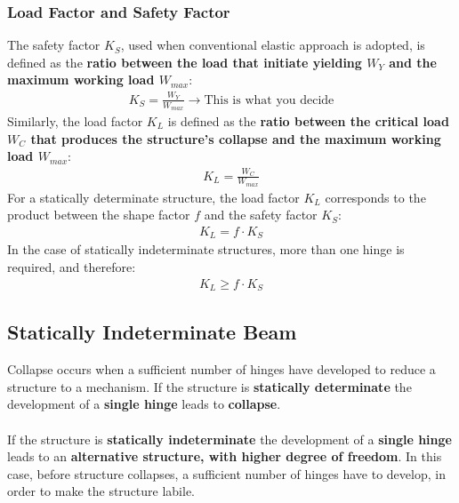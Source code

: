 \subsubsection{\large Load Factor and Safety Factor}
The safety factor $K_S$, used when conventional elastic approach is adopted, is defined as the \textbf{ratio between the load that initiate yielding $W_Y$ and the maximum working load $W_{max}$}:
\begin{gather}
  K_S = \frac{W_Y}{W_{max}} \longrightarrow \text{This is what you decide}
\end{gather}
Similarly, the load factor $K_L$ is defined as the \textbf{ratio between the critical load $W_C$ that produces the structure’s collapse and the maximum working load $W_{max}$}:
\begin{gather}
  K_L = \frac{W_C}{W_{max}}
\end{gather}
For a statically determinate structure, the load factor $K_L$ corresponds to the product between the shape factor $f$ and the safety factor $K_S$:
\begin{gather}
  K_L = f\cdot K_S
\end{gather}
In the case of statically indeterminate structures, more than one hinge is required, and therefore:
\begin{gather}
  K_L \geq f\cdot K_S
\end{gather}
\subsection{Statically Indeterminate Beam}
Collapse occurs when a sufficient number of hinges have developed to reduce a structure to a mechanism. If the structure is \textbf{statically determinate} the development of a \textbf{single hinge} leads to \textbf{collapse}. \\\\
If the structure is \textbf{statically indeterminate} the development of a \textbf{single hinge} leads to an \textbf{alternative structure, with higher degree of freedom}. In this case, before structure collapses, a sufficient number of hinges have to develop, in order to make the structure labile.
